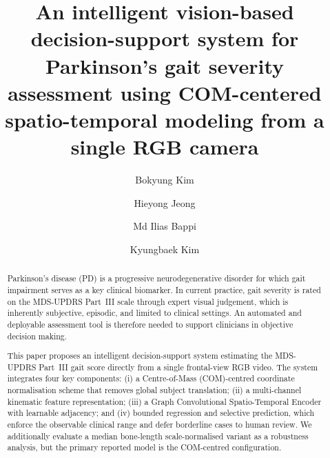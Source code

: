 \documentclass[preprint,12pt]{elsarticle}
\begin{document}
\begin{frontmatter}

\title{An intelligent vision-based decision-support system for
Parkinson's gait severity assessment using COM-centered
spatio-temporal modeling from a single RGB camera}

\author[cnu]{Bokyung Kim}
\author[cnu]{Hieyong Jeong}
\author[cnu]{Md Ilias Bappi}
\author[cnu]{Kyungbaek Kim}


\address[cnu]{Chonnam National University, Gwangju, Republic of Korea}

\begin{abstract}
Parkinson's disease (PD) is a progressive neurodegenerative disorder for
which gait impairment serves as a key clinical biomarker. In current
practice, gait severity is rated on the MDS-UPDRS Part~III scale through
expert visual judgement, which is inherently subjective, episodic, and
limited to clinical settings. An automated and deployable assessment tool
is therefore needed to support clinicians in objective decision making.

This paper proposes an intelligent decision-support system estimating
the MDS-UPDRS Part~III gait score directly from a single frontal-view RGB
video. The system integrates four key components: (i) a Centre-of-Mass
(COM)-centred coordinate normalisation scheme that removes global subject
translation; (ii) a multi-channel kinematic feature representation; (iii) a
Graph Convolutional Spatio-Temporal Encoder with learnable adjacency; and
(iv) bounded regression and selective prediction, which enforce the observable
clinical range and defer borderline cases to human review. We additionally
evaluate a median bone-length scale-normalised variant as a robustness
analysis, but the primary reported model is the COM-centred configuration.


\end{abstract}
\end{frontmatter}
\end{document}
